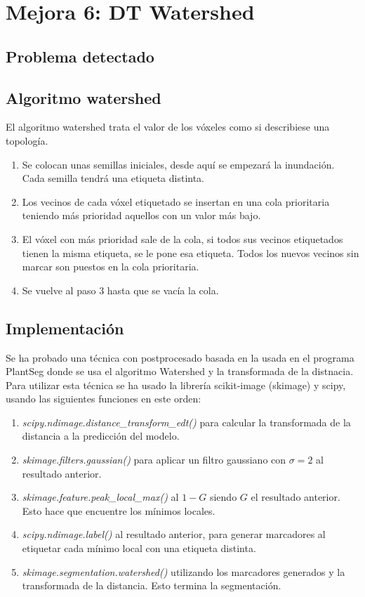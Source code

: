 \chapter{Mejora 6: DT Watershed}\label{dt_watershed}

\section{Problema detectado}\label{sec:dt_watershed_apex_problem}

\section{Algoritmo watershed}\label{sec:dt_watershed_watershed}

El algoritmo watershed trata el valor de los vóxeles como si describiese una topología.
\begin{enumerate}
\item Se colocan unas semillas iniciales, desde aquí se empezará la inundación. Cada semilla tendrá una etiqueta distinta.
\item Los vecinos de cada vóxel etiquetado se insertan en una cola prioritaria teniendo más prioridad aquellos con un valor más bajo.
\item El vóxel con más prioridad sale de la cola, si todos sus vecinos etiquetados tienen la misma etiqueta, se le pone esa etiqueta. Todos los nuevos vecinos sin marcar son puestos en la cola prioritaria.
\item Se vuelve al paso 3 hasta que se vacía la cola.
\end{enumerate}

\section{Implementación}\label{sec:dt_watershed_implementation}

Se ha probado una técnica con postprocesado basada en la usada en el programa PlantSeg \cite{Wolny2020} donde se usa el algoritmo Watershed y la transformada de la distnacia. Para utilizar esta técnica se ha usado la librería scikit-image (skimage) y scipy, usando las siguientes funciones en este orden:
\begin{enumerate}
\item \textit{scipy.ndimage.distance\_transform\_edt()} para calcular la transformada de la distancia a la predicción del modelo.
\item \textit{skimage.filters.gaussian()} para aplicar un filtro gaussiano con $\sigma = 2$ al resultado anterior.
\item \textit{skimage.feature.peak\_local\_max()} al $1 - G$ siendo $G$ el resultado anterior. Esto hace que encuentre los mínimos locales.
\item \textit{scipy.ndimage.label()} al resultado anterior, para generar marcadores al etiquetar cada mínimo local con una etiqueta distinta.
\item \textit{skimage.segmentation.watershed()} utilizando los marcadores generados y la transformada de la distancia. Esto termina la segmentación.
\end{enumerate}

